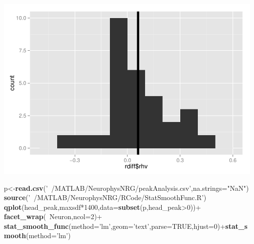 \documentclass[]{article}
\newenvironment{Shaded}{\begin{snugshade}}{\end{snugshade}}
\newcommand{\KeywordTok}[1]{\textcolor[rgb]{0.13,0.29,0.53}{\textbf{{#1}}}}
\newcommand{\DataTypeTok}[1]{\textcolor[rgb]{0.13,0.29,0.53}{{#1}}}
\newcommand{\DecValTok}[1]{\textcolor[rgb]{0.00,0.00,0.81}{{#1}}}
\newcommand{\StringTok}[1]{\textcolor[rgb]{0.31,0.60,0.02}{{#1}}}
\newcommand{\OtherTok}[1]{\textcolor[rgb]{0.56,0.35,0.01}{{#1}}}
\newcommand{\NormalTok}[1]{{#1}}
\begin{document}
\includegraphics{ExtraFigs_files/figure-latex/ttestovgsps-2.pdf}

\begin{Shaded}
\begin{Highlighting}[]
\NormalTok{p<-}\KeywordTok{read.csv}\NormalTok{(}\StringTok{'~/MATLAB/NeurophysNRG/peakAnalysis.csv'}\NormalTok{,}\DataTypeTok{na.strings=}\StringTok{"NaN"}\NormalTok{)}
\KeywordTok{source}\NormalTok{(}\StringTok{'~/MATLAB/NeurophysNRG/RCode/StatSmoothFunc.R'}\NormalTok{)}
\KeywordTok{qplot}\NormalTok{(head_peak,maxsdf*}\DecValTok{1400}\NormalTok{,}\DataTypeTok{data=}\KeywordTok{subset}\NormalTok{(p,head_peak>}\DecValTok{0}\NormalTok{))+}
\StringTok{  }\KeywordTok{facet_wrap}\NormalTok{(~Neuron,}\DataTypeTok{ncol=}\DecValTok{2}\NormalTok{)+}
\StringTok{  }\KeywordTok{stat_smooth_func}\NormalTok{(}\DataTypeTok{method=}\StringTok{'lm'}\NormalTok{,}\DataTypeTok{geom=}\StringTok{'text'}\NormalTok{,}\DataTypeTok{parse=}\OtherTok{TRUE}\NormalTok{,}\DataTypeTok{hjust=}\DecValTok{0}\NormalTok{)+}\KeywordTok{stat_smooth}\NormalTok{(}\DataTypeTok{method=}\StringTok{'lm'}\NormalTok{)}
\end{Highlighting}
\end{Shaded}
\end{document}
